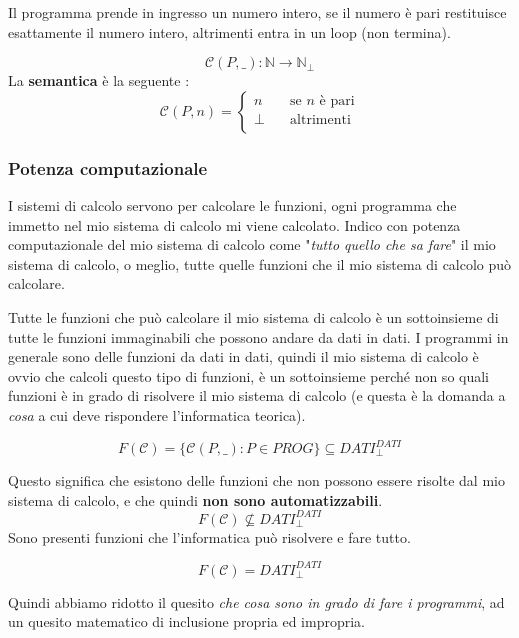 \documentclass{article}
\begin{document}
Il programma prende in ingresso un numero intero, se il numero è pari restituisce
esattamente il numero intero, altrimenti entra in un loop (non termina).

$$\mathcal{C}(P,\_):\mathbb{N}\rightarrow\mathbb{N}_{\bot}$$
La \textbf{semantica} è la seguente :
\[
    \mathcal{C}(P,n) =
    \begin{cases}
        n    & \quad\text{se }n\text{ è pari} \\
        \bot & \quad\text{altrimenti}         \\
    \end{cases}
\]

\subsubsection{Potenza computazionale}
I sistemi di calcolo servono per calcolare le funzioni, ogni programma che immetto
nel mio sistema di calcolo mi viene calcolato. Indico con potenza computazionale
del mio sistema di calcolo come "\textit{tutto quello che sa fare}" il mio sistema di
calcolo, o meglio, tutte quelle funzioni che il mio sistema di calcolo può calcolare.

Tutte le funzioni che può calcolare il mio sistema di calcolo è un sottoinsieme
di tutte le funzioni immaginabili che possono andare da dati in dati. I programmi
in generale sono delle funzioni da dati in dati, quindi il mio sistema di calcolo
è ovvio che calcoli questo tipo di funzioni, è un sottoinsieme perché non so quali
funzioni è in grado di risolvere il mio sistema di calcolo (e questa è la domanda
a \textit{cosa} a cui deve rispondere l'informatica teorica).

$$F(\mathcal{C})=\{\mathcal{C}(P,\_):P\in PROG\}\subseteq DATI_{\bot}^{DATI}$$

Questo significa che esistono delle funzioni che non possono essere risolte dal mio
sistema di calcolo, e che quindi \textbf{non sono automatizzabili}.
$$F(\mathcal{C})\nsubseteq DATI_{\bot}^{DATI}$$
Sono presenti funzioni che l'informatica può risolvere e fare tutto.

$$F(\mathcal{C})=DATI_{\bot}^{DATI}$$

Quindi abbiamo ridotto il quesito \textit{che cosa sono in grado di fare i programmi},
ad un quesito matematico di inclusione propria ed impropria.
\end{document}
